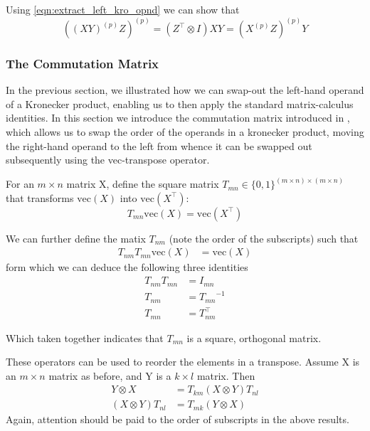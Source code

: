 \documentclass[10pt,fleqn]{article}
\newcommand \vecf[1] {
    \text{vec}\left(#1\right)
}
\newcommand \T { ^\top }
\newcommand \inv[1] { {#1}^{-1} }
\newcommand \vt[2] { { #1^{(#2)} } }
\begin{document}
\begin{appendices}
Using \eqref{eqn:extract_left_kro_opnd} we can show that
\begin{equation}
\vt{(\vt{(XY)}{p}Z)}{p} = (Z\T \otimes I)XY = \vt{(\vt{X}{p}Z)}{p}Y
\end{equation}

\subsubsection{The Commutation Matrix}
\label{sec:commutation-matrix}
In the previous section, we illustrated how we can swap-out the left-hand operand of a Kronecker product, enabling us to then apply the standard matrix-calculus identities. In this section we introduce the commutation matrix introduced in \cite{Magnus1988}, which allows us to swap the order of the operands in a kronecker product, moving the right-hand operand to the left from whence it can be swapped out subsequently using the vec-transpose operator.

For an $m \times n$ matrix X, define the square matrix $T_{mn} \in \{0,1\}^{(m \times n) \times (m \times n)}$ that transforms $\vecf{X}$ into $\vecf{X\T}$:
\begin{equation}
T_{mn} \vecf{X} = \vecf{X\T}
\end{equation}

We can further define the matix $T_{nm}$ (note the order of the subscripts) such that
\begin{align}
T_{nm} T_{mn} \vecf{X}  & = \vecf{X} 
\end{align}
form which we can deduce the following three identities
\begin{align}
T_{nm} T_{mn}           &= I_{mn} \\
T_{nm}                  &= \inv{T_{mn}} \\
T_{mn}                  &= T_{nm}\T \label{eqn:transform_transpose}
\end{align}

Which taken together indicates that $T_{mn}$ is a square, orthogonal matrix. 

These operators can be used to reorder the elements in a transpose. Assume X is an $m \times n$ matrix as before, and Y is a $k \times l$ matrix. Then
\begin{align}
Y \otimes X & = T_{km} (X \otimes Y) T_{nl} \label{eqn:kro_reorder} \\
(X \otimes Y)T_{nl} & = T_{mk} (Y \otimes X)
\end{align}
Again, attention should be paid to the order of subscripts in the above results.


\end{appendices}
\end{document}
